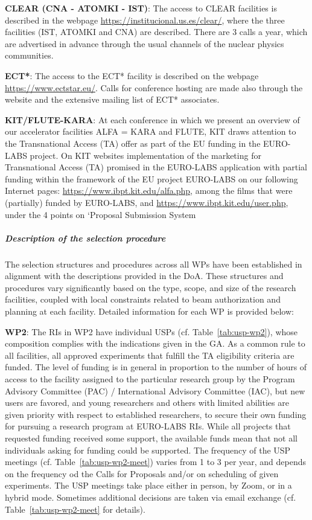 \textbf{CLEAR (CNA - ATOMKI - IST)}: The access to CLEAR facilities is described in the webpage \url{https://institucional.us.es/clear/}, where the three facilities (IST, ATOMKI and CNA) are described. There are 3 calls a year, which are advertised in advance through the usual channels of the nuclear physics communities.

\textbf{ECT*}: The access to the ECT* facility is described on the webpage \url{https://www.ectstar.eu/}. Calls for conference hosting are made also through the website and the extensive mailing list of ECT* associates.



\textbf{KIT/FLUTE-KARA}: At each conference in which we present an overview of our accelerator facilities ALFA = KARA and FLUTE, KIT draws attention to the Transnational Access (TA) offer as part of the EU funding in the EURO-LABS project. On KIT websites implementation of the marketing for Transnational Access (TA) promised in the EURO-LABS application with partial funding within the framework of the EU project EURO-LABS on our following Internet pages: \url{https://www.ibpt.kit.edu/alfa.php}, among the films that were (partially) funded by EURO-LABS, and
\url{https://www.ibpt.kit.edu/user.php}, under the 4 points on ‘Proposal Submission System


\subparagraph{Description of the selection procedure}\mbox{}

The selection structures and procedures across all WPs have been established in alignment with the descriptions provided in the DoA. These structures and procedures vary significantly based on the type, scope, and size of the research facilities, coupled with local constraints related to beam authorization and planning at each facility. Detailed information for each WP is provided below:

\textbf{WP2}: The RIs in WP2 have individual USPs (cf. Table~\ref{tab:usp-wp2}), whose composition complies with the indications given in the GA. As a common rule to all facilities, all approved experiments that fulfill the TA eligibility criteria are funded. The level of funding is in general in proportion to the number of hours of access to the facility assigned to the particular research group by the Program Advisory Committee (PAC) / International Advisory Committee (IAC), but new users are favored, and young researchers and others with limited abilities are given priority with respect to established researchers, to secure their own funding for pursuing a research program at EURO-LABS RIs. While all projects that requested funding received some support, the available funds mean that not all individuals asking for funding could be supported. The frequency of the USP meetings (cf. Table~\ref{tab:usp-wp2-meet}) varies from 1 to 3 per year, and depends on the frequency od the Calls for Proposals and/or on scheduling of given experiments. The USP meetings take place either in person, by Zoom, or in a hybrid mode. Sometimes additional decisions are taken via email exchange (cf. Table~\ref{tab:usp-wp2-meet} for details).


